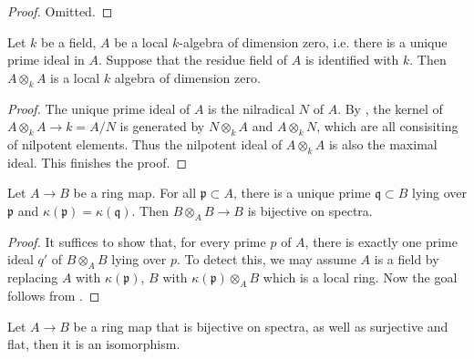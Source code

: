 \begin{proof}
    \mathlibok
    Omitted.
\end{proof}

\begin{lemma}
    \label{lem:local-dim-zero-tensor}
    Let $k$ be a field, $A$ be a local $k$-algebra of dimension zero, i.e. there is a unique
    prime ideal in $A$. Suppose that the residue field of $A$ is identified with $k$.
    Then $A \otimes_k A$ is a local $k$ algebra of dimension zero.
    \leanok
\end{lemma}

\begin{proof}
    The unique prime ideal of $A$ is the nilradical $N$ of $A$. By
    , the kernel of $A \otimes_k A \to k = A/N$ is generated by
    $N \otimes_k A$ and $A \otimes_k N$, which are all consisiting of nilpotent elements.
    Thus the nilpotent ideal of $A \otimes_k A$ is also the maximal ideal. This finishes the proof.
\end{proof}

\begin{lemma}
    \label{lem:bij-on-spectrum-of-unique-lying-over-and-residue-field-eq}
    Let $A \to B$ be a ring map. For all $\mathfrak{p} \subset A$,
    there is a unique prime $\mathfrak{q} \subset B$ lying over $\mathfrak{p}$ and
    $\kappa(\mathfrak{p}) = \kappa(\mathfrak{q})$. Then $B \otimes_A B \to B$ is bijective on
    spectra.
    \leanok
\end{lemma}

\begin{proof}
    It suffices to show that, for every prime $p$ of $A$, there is exactly one prime ideal $q'$
    of $B \otimes_A B$ lying over $p$. To detect this, we may assume $A$ is a field by replacing
    $A$ with $\kappa(\mathfrak{p})$, $B$ with $\kappa(\mathfrak{p}) \otimes_A B$ which is a local
    ring. Now the goal follows from .
\end{proof}

\begin{lemma}
    \label{lem:iso-of-bij-on-spectrum-and-surj-and-flat}
    Let $A \to B$ be a ring map that is bijective on spectra, as well as surjective and flat, then
    it is an isomorphism.
    \leanok
\end{lemma}

